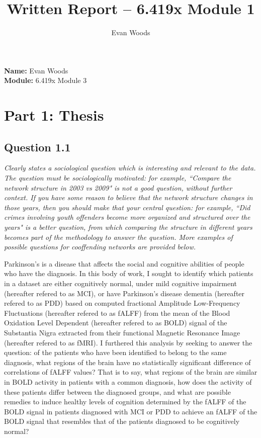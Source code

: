 \documentclass[12pt]{article}
\title{Written Report – 6.419x Module 1}
\author{Evan Woods}
\date{}
\begin{document}
\maketitle

\tableofcontents
\newpage


\noindent \textbf{Name:} Evan Woods \\
\noindent \textbf{Module:} 6.419x Module 3

\section{Part 1: Thesis}

\subsection{Question 1.1}
\textit{Clearly states a sociological question which is interesting and relevant to the data. The question must be sociologically motivated: for example, “Compare the network structure in 2003 vs 2009" is not a good question, without further context. If you have some reason to believe that the network structure changes in those years, then you should make that your central question: for example, “Did crimes involving youth offenders become more organized and structured over the years" is a better question, from which comparing the structure in different years becomes part of the methodology to answer the question. More examples of possible questions for cooffending networks are provided below. }

Parkinson's is a disease that affects the social and cognitive abilities of people who have the diagnosis. In this body of work, I sought to identify which patients in a dataset are either cognitively normal, under mild cognitive impairment (hereafter refered to as MCI), or have Parkinson's disease dementia (hereafter refered to as PDD) based on computed fractional Amplitude Low-Frequency Fluctuations (hereafter refered to as fALFF) from the mean of the Blood Oxidation Level Dependent (hereafter refered to as BOLD) signal of the Substantia Nigra extracted from their functional Magnetic Resonance Image (hereafter refered to as fMRI). I furthered this analysis by seeking to answer the question: of the patients who have been identified to belong to the same diagnosis, what regions of the brain have no statistically significant difference of correlations of fALFF values? That is to say, what regions of the brain are similar in BOLD activity in patients with a common diagnosis, how does the activity of these patients differ between the diagnosed groups, and what are possible remedies to induce healthy levels of cognition determined by the fALFF of the BOLD signal in patients diagnosed with MCI or PDD to achieve an fALFF of the BOLD signal that resembles that of the patients diagnosed to be cognitively normal?   
\end{document}
